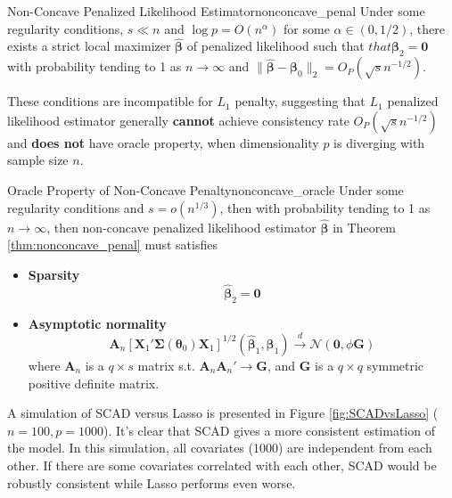 \documentclass[twoside]{article}
\begin{document}
\begin{theorem}{Non-Concave Penalized Likelihood Estimator}{nonconcave_penal}
    Under some regularity conditions, $s\ll n$ and $\log p = O(n^{\alpha})$ for some $\alpha \in (0,1/2)$, there exists a strict local maximizer $\hat{\boldsymbol{\beta}}$ of penalized likelihood such that $that{\boldsymbol{\beta}}_2=\mathbf{0}$ with probability tending to 1 as $n\rightarrow \infty$ and $\lVert \hat{\boldsymbol{\beta}}-\boldsymbol{\beta}_0 \rVert _2=O_P(\sqrt{s}n^{-1/2})$.
\end{theorem}
These conditions are incompatible for $L_1$ penalty, suggesting that $L_1$ penalized likelihood estimator generally \textbf{cannot} achieve consistency rate $O_P(\sqrt{s}n^{-1/2})$ and \textbf{does not} have oracle property, when dimensionality $p$ is diverging with sample size $n$.

\begin{theorem}{Oracle Property of Non-Concave Penalty}{nonconcave_oracle}
    Under some regularity conditions and $s=o(n^{1/3})$, then with probability tending to 1 as $n\rightarrow \infty$, then non-concave penalized likelihood estimator $\hat{\boldsymbol{\beta}}$ in Theorem \ref{thm:nonconcave_penal} must satisfies 
    \begin{itemize}
        \item \textbf{Sparsity} $$\hat{\boldsymbol{\beta}}_2 =\mathbf{0}$$
        \item \textbf{Asymptotic normality} $$ \mathbf{A}_n \left[ \mathbf{X}_1' \boldsymbol{\Sigma}(\boldsymbol{\theta}_0)\mathbf{X}_1 \right]^{1/2}(\hat{\boldsymbol{\beta}}_1,\boldsymbol{\beta}_1) \xrightarrow{d} \mathcal{N}(\mathbf{0},\phi\mathbf{G}) $$
        where $\mathbf{A}_n$ is a $q\times s$ matrix s.t. $\mathbf{A}_n\mathbf{A}_n'\rightarrow \mathbf{G}$, and $\mathbf{G}$ is a $q\times q$ symmetric positive definite matrix.
    \end{itemize}
\end{theorem}

A simulation of SCAD versus Lasso is presented in Figure \ref{fig:SCADvsLasso} ($n=100,p=1000$). It's clear that SCAD gives a more consistent estimation of the model. In this simulation, all covariates (1000) are independent from each other. If there are some covariates correlated with each other, SCAD would be robustly consistent while Lasso performs even worse.
\end{document}
